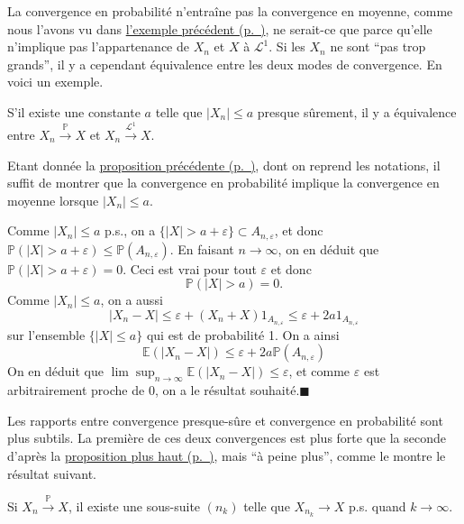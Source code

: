 La convergence en probabilité n'entraîne pas la convergence en moyenne,
comme nous l'avons vu dans \protect\hyperref[IV-lien2]{l'exemple
précédent (p.~\pageref*{IV-lien2})}, ne serait-ce que parce qu'elle
n'implique pas l'appartenance de \(X_n\) et \(X\) à \(\mathcal{L}^1\).
Si les \(X_n\) ne sont ``pas trop grands'', il y a cependant équivalence
entre les deux modes de convergence. En voici un exemple.

\begin{proposition}\label{IV-propconv2}

S'il existe une constante \(a\) telle que \(|X_n| \leq a\) presque
sûrement, il y a équivalence entre \(X_n \xrightarrow{\mathbb{P}} X\) et
\(X_n \xrightarrow{\mathcal{L}^1} X\).
\end{proposition}

\begin{preuve}
Etant donnée la \protect\hyperref[IV-propconv1]{proposition
précédente (p.~\pageref*{IV-propconv1})}, dont on reprend les notations,
il suffit de montrer que la convergence en probabilité implique la
convergence en moyenne lorsque \(|X_n| \leq a\).

Comme \(|X_n| \leq a\) p.s., on a
\(\{|X| > a +\varepsilon\} \subset A_{n,\varepsilon}\), et donc
\(\mathbb{P}(|X| > a +\varepsilon ) \leq \mathbb{P}(A_{n,\varepsilon})\).
En faisant \(n \to \infty\), on en déduit que
\(\mathbb{P}(|X| > a + \varepsilon) = 0\). Ceci est vrai pour tout
\(\varepsilon\) et donc \[\mathbb{P}(|X|> a) = 0.\] Comme
\(|X_n| \leq a\), on a aussi
\[ |X_n -X| \leq \varepsilon + (X_n + X) 1_{A_{n,\varepsilon}} \leq \varepsilon + 2a 1_{A_{n,\varepsilon}}\]
sur l'ensemble \(\{|X| \leq a \}\) qui est de probabilité 1. On a ainsi
\[ \mathbb{E}(|X_n - X|) \leq \varepsilon +2a \mathbb{P}(A_{n,\varepsilon})\]
On en déduit que
\(\lim \sup_{n \to \infty} \mathbb{E}(|X_n - X|) \leq \varepsilon\), et
comme \(\varepsilon\) est arbitrairement proche de 0, on a le résultat
souhaité.\hfill$\blacksquare$
\end{preuve}

Les rapports entre convergence presque-sûre et convergence en
probabilité sont plus subtils. La première de ces deux convergences est
plus forte que la seconde d'après la
\protect\hyperref[IV-propconv1]{proposition plus
haut (p.~\pageref*{IV-propconv1})}, mais ``à peine plus'', comme le
montre le résultat suivant.

\begin{proposition}\label{IV-propconv3}

Si \(X_n \xrightarrow{\mathbb{P}} X\), il existe une sous-suite
\((n_k)\) telle que \(X_{n_k} \to X\) p.s. quand \(k \to \infty\).
\end{proposition}

